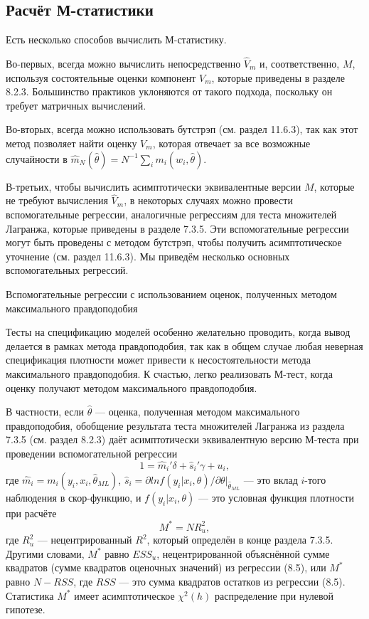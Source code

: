 \subsection{Расчёт М-статистики}

Есть несколько способов вычислить М-статистику.

Во-первых, всегда можно вычислить непосредственно $\hat{V}_m$ и, соответственно, $M$, используя состоятельные оценки компонент $V_m$, которые приведены в разделе 8.2.3. Большинство практиков уклоняются от такого подхода, поскольку он требует матричных вычислений.

Во-вторых, всегда можно использовать бутстрэп (см. раздел 11.6.3), так как этот метод позволяет найти оценку $V_m$, которая отвечает за все возможные случайности в $\hat{m}_N (\hat{\theta}) = N^{-1}\sum_i m_i(w_i, \hat{\theta})$.  

В-третьих, чтобы вычислить асимптотически эквивалентные версии $M$, которые не требуют вычисления $\hat{V}_m$, в некоторых случаях можно провести вспомогательные регрессии, аналогичные регрессиям для теста множителей Лагранжа, которые приведены в разделе 7.3.5. Эти вспомогательные регрессии могут быть проведены с методом бутстрэп, чтобы получить асимптотическое уточнение (см. раздел 11.6.3). Мы приведём несколько основных вспомогательных регрессий.

\begin{center}
Вспомогательные регрессии с использованием оценок, полученных методом максимального правдоподобия
\end{center}

Тесты на спецификацию моделей особенно желательно проводить, когда вывод делается в рамках метода правдоподобия, так как в общем случае любая неверная спецификация плотности может привести к несостоятельности метода максимального правдоподобия. К счастью, легко реализовать М-тест, когда оценку получают методом максимального правдоподобия.

В частности, если $\hat{\theta}$ --- оценка, полученная методом максимального правдоподобия, обобщение результата теста множителей Лагранжа из раздела 7.3.5 (см. раздел 8.2.3) даёт асимптотически эквивалентную версию М-теста при проведении вспомогательной регрессии
\begin{equation}
1 = \hat{m}_i' \delta + \hat{s}_i' \gamma + u_i,
\end{equation}
где $\hat{m}_i = m_i(y_i, x_i, \hat{\theta}_{ML})$, $\hat{s}_i = \partial{lnf(y_i|x_i, \theta)}/\partial{\theta}|_{\hat{\theta}_{ML}}$ --- это вклад $i$-того наблюдения в скор-функцию, и $f(y_i|x_i, \theta)$ --- это условная функция плотности при расчёте
\begin{equation}
M^{*} = NR_u^2,
\end{equation}
где $R_u^2$ --- нецентрированный $R^2$, который определён в конце раздела 7.3.5. Другими словами, $M^{*}$ равно $ESS_u$, нецентрированной объяснённой сумме квадратов (сумме квадратов оценочных значений) из регрессии (8.5), или $M^{*}$ равно $N - RSS$, где $RSS$ --- это сумма квадратов остатков из регрессии (8.5). Статистика $M^{*}$ имеет асимптотическое $\chi^2(h)$ распределение при нулевой гипотезе.


